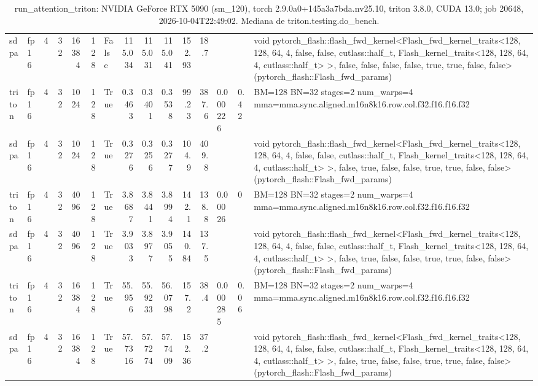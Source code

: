 \begin{table}[htbp]
\begin{tabular}{llrrrrlrrrrrlll}
    sdpa & fp16 & 4 & 32 & 16384 & 128 & False & 115.034 & 115.031 & 115.041 & 152.93 & 18.7 &  &  & void pytorch\_flash::flash\_fwd\_kernel<Flash\_fwd\_kernel\_traits<128, 128, 64, 4, false, false, cutlass::half\_t, Flash\_kernel\_traits<128, 128, 64, 4, cutlass::half\_t> >, false, false, false, false, true, true, false, false>(pytorch\_flash::Flash\_fwd\_params) \\
    triton & fp16 & 4 & 32 & 1024 & 128 & True & 0.3463 & 0.3401 & 0.3538 & 99.23 & 387.6 & 0.000226 & 0.42 & BM=128 BN=32 stages=2 num\_warps=4 mma=mma.sync.aligned.m16n8k16.row.col.f32.f16.f16.f32 \\
    sdpa & fp16 & 4 & 32 & 1024 & 128 & True & 0.3276 & 0.3256 & 0.3277 & 104.9 & 409.8 &  &  & void pytorch\_flash::flash\_fwd\_kernel<Flash\_fwd\_kernel\_traits<128, 128, 64, 4, false, false, cutlass::half\_t, Flash\_kernel\_traits<128, 128, 64, 4, cutlass::half\_t> >, false, true, false, false, true, true, false, false>(pytorch\_flash::Flash\_fwd\_params) \\
    triton & fp16 & 4 & 32 & 4096 & 128 & True & 3.8687 & 3.8441 & 3.8994 & 142.1 & 138.8 & 0.00026 & 0 & BM=128 BN=32 stages=2 num\_warps=4 mma=mma.sync.aligned.m16n8k16.row.col.f32.f16.f16.f32 \\
    sdpa & fp16 & 4 & 32 & 4096 & 128 & True & 3.9033 & 3.8977 & 3.9055 & 140.84 & 137.5 &  &  & void pytorch\_flash::flash\_fwd\_kernel<Flash\_fwd\_kernel\_traits<128, 128, 64, 4, false, false, cutlass::half\_t, Flash\_kernel\_traits<128, 128, 64, 4, cutlass::half\_t> >, false, true, false, false, true, true, false, false>(pytorch\_flash::Flash\_fwd\_params) \\
    triton & fp16 & 4 & 32 & 16384 & 128 & True & 55.956 & 55.9233 & 56.0798 & 157.2 & 38.4 & 0.000285 & 0.06 & BM=128 BN=32 stages=2 num\_warps=4 mma=mma.sync.aligned.m16n8k16.row.col.f32.f16.f16.f32 \\
    sdpa & fp16 & 4 & 32 & 16384 & 128 & True & 57.7316 & 57.7274 & 57.7409 & 152.36 & 37.2 &  &  & void pytorch\_flash::flash\_fwd\_kernel<Flash\_fwd\_kernel\_traits<128, 128, 64, 4, false, false, cutlass::half\_t, Flash\_kernel\_traits<128, 128, 64, 4, cutlass::half\_t> >, false, true, false, false, true, true, false, false>(pytorch\_flash::Flash\_fwd\_params) \\
    \bottomrule
  \end{tabular}
  \caption{run\_attention\_triton: NVIDIA GeForce RTX 5090 (sm\_120), torch 2.9.0a0+145a3a7bda.nv25.10, triton 3.8.0, CUDA 13.0; job 20648, 2026-10-04T22:49:02. Mediana de triton.testing.do\_bench.}
  \label{tab:pascal-run-attention-triton}
\end{table}
